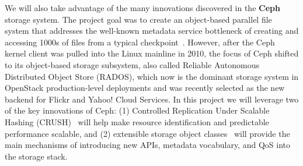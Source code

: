 We will also take advantage of the many innovations discovered in the {\bf Ceph}~\cite{weil:osdi06} storage
system. 
%
%
 The project goal was to create an
object-based parallel file system that addresses the well-known metadata
service bottleneck of creating and accessing 1000s of files from a typical 
checkpoint~\cite{weil:osdi06}.  However, after the Ceph kernel client was
pulled into the Linux mainline in 2010, the focus of Ceph shifted to its
object-based storage subsystem, also called Reliable Autonomous Distributed
Object Store (RADOS), which now is the dominant storage system in OpenStack
production-level deployments and was recently selected as the new backend for
Flickr and Yahoo! Cloud Services. In this project we will leverage two of the
key innovations of Ceph: (1) Controlled Replication Under Scalable Hashing
(CRUSH)~\cite{weil:sc06} will help make resource identification and
predictable performance scalable, and (2) extensible storage object
classes~\cite{watkins:ucsctr15} will provide the main mechanisms of introducing
new APIs, metadata vocabulary, and QoS into the storage stack.

